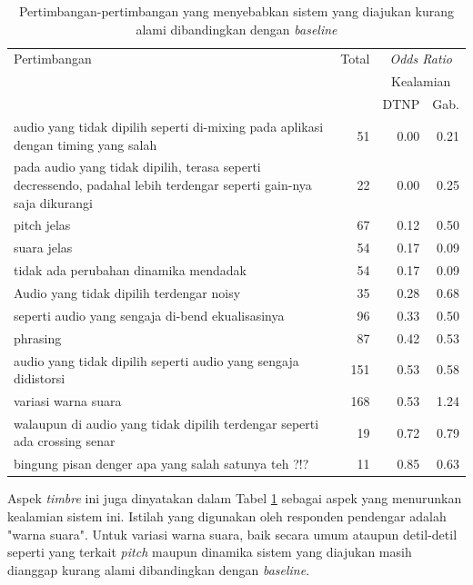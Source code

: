 \begin{table}[htbp]
  \begin{center}
	\caption{Pertimbangan-pertimbangan yang menyebabkan sistem yang diajukan kurang alami dibandingkan dengan \textit{baseline}}\label{tab-pertimbangan-oddsratio-lessnatural}
	\begin{tabular}{|p{}|r|r|r|}
	\hline
Pertimbangan&	Total&	\multicolumn{2}{|c|}{\textit{Odds Ratio}}\\
&	&	\multicolumn{2}{|c|}{Kealamian}\\
\cline{3-4}
&	&	DTNP	&Gab.
\\\hline
audio yang tidak dipilih seperti di-mixing pada aplikasi dengan timing yang salah&	51&	0.00&	0.21\\\hline
pada audio yang tidak dipilih, terasa seperti decressendo, padahal lebih terdengar seperti gain-nya saja dikurangi&	22&	0.00&	0.25\\\hline
pitch jelas&	67&	0.12&	0.50\\\hline
suara jelas&	54&	0.17&	0.09\\\hline
tidak ada perubahan dinamika mendadak&	54&	0.17&	0.09\\\hline
Audio yang tidak dipilih terdengar noisy&	35&	0.28&	0.68\\\hline
seperti audio yang sengaja di-bend ekualisasinya&	96&	0.33&	0.50\\\hline
phrasing&	87&	0.42&	0.53\\\hline
audio yang tidak dipilih seperti audio yang sengaja didistorsi&	151&	0.53&	0.58\\\hline
variasi warna suara&	168&	0.53&	1.24\\\hline
walaupun di audio yang tidak dipilih terdengar seperti ada crossing senar&	19&	0.72&	0.79\\\hline
bingung pisan denger apa yang salah satunya teh ?!?&	11&	0.85&	0.63\\\hline
	\end{tabular}
  \end{center}
\end{table}

Aspek \textit{timbre} ini juga dinyatakan dalam Tabel \ref{tab-pertimbangan-oddsratio-lessnatural} sebagai aspek yang menurunkan kealamian sistem ini. Istilah yang digunakan oleh responden pendengar adalah "warna suara". Untuk variasi warna suara, baik secara umum ataupun detil-detil seperti yang terkait \textit{pitch} maupun dinamika sistem yang diajukan masih dianggap kurang alami dibandingkan dengan \textit{baseline}.

